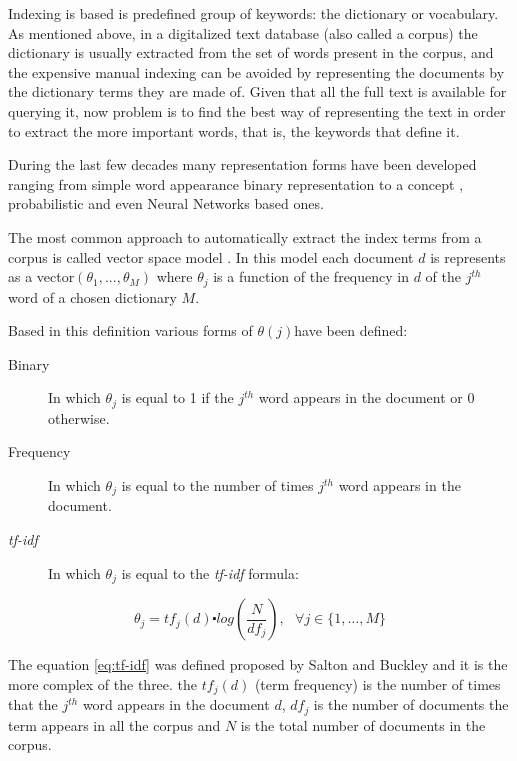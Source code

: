 Indexing is based is predefined group of keywords: the dictionary
or vocabulary. As mentioned above, in a digitalized text database
(also called a corpus) the dictionary is usually extracted from the
set of words present in the corpus, and the expensive manual indexing
can be avoided by representing the documents by the dictionary terms
they are made of. Given that all the full text is available for querying
it, now problem is to find the best way of representing the text in
order to extract the more important words, that is, the keywords that
define it. 

During the last few decades many representation forms have been developed
ranging from simple word appearance binary representation to a concept
\cite{deerwester90indexing}, probabilistic \cite{keller-theme} and
even Neural Networks \cite{DBLP:conf/icann/KellerB05} based ones. 

The most common approach to automatically extract the index terms
from a corpus is called vector space model \cite{361220}. In this
model each document $d$ is represents as a vector$(\theta_{1},...,\theta_{M})$
where $\theta_{j}$ is a function of the frequency in $d$ of the
$j^{th}$ word of a chosen dictionary $M$. 

Based in this definition various forms of $\theta(j)$have been defined:

\begin{description}
\item [{Binary}] In which $\theta_{j}$ is equal to 1 if the $j^{th}$
word appears in the document or 0 otherwise.
\item [{Frequency}] In which $\theta_{j}$ is equal to the number of times
$j^{th}$ word appears in the document.
\item [{\emph{tf-idf}}] In which $\theta_{j}$ is equal to the \emph{tf-idf}
formula:
\end{description}
\begin{equation}
\theta_{j}=tf_{j}(d)\centerdot log(\frac{N}{df_{j}}),\,\,\,\,\forall j\in\{1,\ldots,M\}\label{eq:tf-idf}\end{equation}


The equation \ref{eq:tf-idf} was defined proposed by Salton and Buckley
\cite{866292} and it is the more complex of the three. the $tf_{j}(d)$
(term frequency) is the number of times that the $j^{th}$ word appears
in the document $d$, $df_{j}$ is the number of documents the term
appears in all the corpus and $N$ is the total number of documents
in the corpus. 

